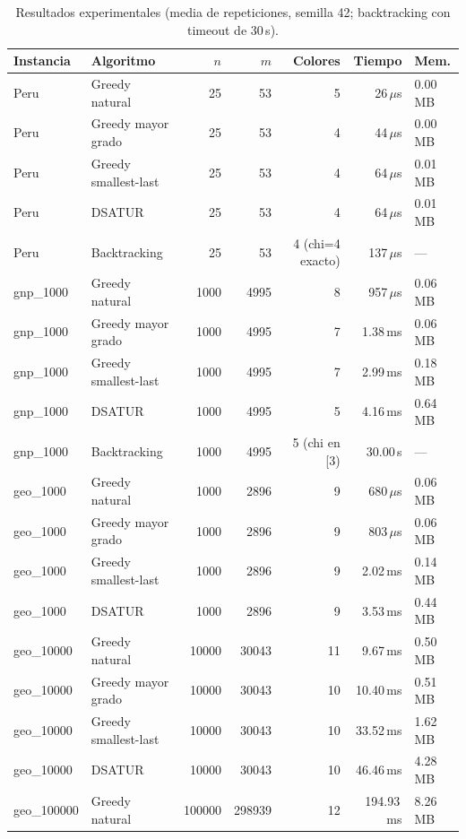 \begin{table}[h]\centering\small
\caption{Resultados experimentales (media de repeticiones, semilla 42; backtracking con timeout de 30\,s).}
\begin{tabular}{@{}llrrrrl@{}}
\toprule
\textbf{Instancia} & \textbf{Algoritmo} & $n$ & $m$ & \textbf{Colores} & \textbf{Tiempo} & \textbf{Mem.}\\
\midrule
Peru & Greedy natural & 25 & 53 & 5 & 26\,$\mu$s & 0.00\,MB\\
Peru & Greedy mayor grado & 25 & 53 & 4 & 44\,$\mu$s & 0.00\,MB\\
Peru & Greedy smallest-last & 25 & 53 & 4 & 64\,$\mu$s & 0.01\,MB\\
Peru & DSATUR & 25 & 53 & 4 & 64\,$\mu$s & 0.01\,MB\\
Peru & Backtracking & 25 & 53 & 4 (chi=4 exacto) & 137\,$\mu$s & ---\\
\addlinespace
gnp\_1000 & Greedy natural & 1000 & 4995 & 8 & 957\,$\mu$s & 0.06\,MB\\
gnp\_1000 & Greedy mayor grado & 1000 & 4995 & 7 & 1.38\,ms & 0.06\,MB\\
gnp\_1000 & Greedy smallest-last & 1000 & 4995 & 7 & 2.99\,ms & 0.18\,MB\\
gnp\_1000 & DSATUR & 1000 & 4995 & 5 & 4.16\,ms & 0.64\,MB\\
gnp\_1000 & Backtracking & 1000 & 4995 & 5 (chi en [3) & 30.00\,s & ---\\
\addlinespace
geo\_1000 & Greedy natural & 1000 & 2896 & 9 & 680\,$\mu$s & 0.06\,MB\\
geo\_1000 & Greedy mayor grado & 1000 & 2896 & 9 & 803\,$\mu$s & 0.06\,MB\\
geo\_1000 & Greedy smallest-last & 1000 & 2896 & 9 & 2.02\,ms & 0.14\,MB\\
geo\_1000 & DSATUR & 1000 & 2896 & 9 & 3.53\,ms & 0.44\,MB\\
\addlinespace
geo\_10000 & Greedy natural & 10000 & 30043 & 11 & 9.67\,ms & 0.50\,MB\\
geo\_10000 & Greedy mayor grado & 10000 & 30043 & 10 & 10.40\,ms & 0.51\,MB\\
geo\_10000 & Greedy smallest-last & 10000 & 30043 & 10 & 33.52\,ms & 1.62\,MB\\
geo\_10000 & DSATUR & 10000 & 30043 & 10 & 46.46\,ms & 4.28\,MB\\
\addlinespace
geo\_100000 & Greedy natural & 100000 & 298939 & 12 & 194.93\,ms & 8.26\,MB\\

\end{tabular}
\end{table}
